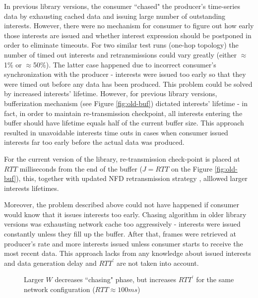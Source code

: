 \documentclass{icn/sig-alternate-2012} %
\begin{document}
In previous library versions, the consumer ``chased" the producer's time-series data by exhausting cached data and issuing large number of outstanding interests. However, there were no mechanism for consumer to figure out how early those interests are issued and whether interest expression should be postponed in order to eliminate timeouts. For two similar test runs (one-hop topology) the number of timed out interests and retransmissions could vary greatly (either $\approx$1\% or $\approx$50\%). The latter case happened due to incorrect consumer's synchronization with the producer - interests were issued too early so that they were timed out before any data has been produced. This problem could be solved by increased interests' lifetime. However, for previous library versions, bufferization mechanism (see Figure \ref{fig:old-buf}) dictated interests' lifetime - in fact, in order to maintain re-transmission checkpoint, all interests entering the buffer should have lifetime equals half of the current buffer size. This approach resulted in unavoidable interests time outs in cases when consumer issued interests far too early before the actual data was produced.


For the current version of the library, re-transmission check-point is placed at $RTT$ milliseconds from the end of the buffer ($J=RTT$ on the Figure \ref{fig:old-buf}), this, together with updated NFD retransmission strategy \cite{nfd-rtx-release}, alllowed larger interests lifetimes.

Moreover, the problem described above could not have happened if consumer would know that it issues interests too early. Chasing algorithm in older library versions was exhausting network cache too aggressively - interests were issued constantly unless they fill up the buffer. After that, frames were retrieved at producer's rate and more interests issued unless consumer starts to receive the most recent data. This approach lacks from any knowledge about issued interests and data generation delay and $RTT^\prime$ are not taken into account.

\begin{figure}[t!]
\centering
\begin{scriptsize}
\end{scriptsize}
\caption{Larger $W$ decreases ``chasing" phase, but increases $RTT^\prime$ for the same network configuration ($RTT\approx100ms$)}
\label{fig:ws}
\end{figure}
\end{document}
